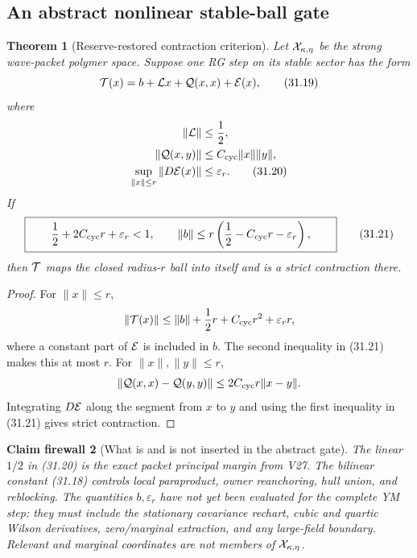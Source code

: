 \documentclass[11pt,oneside]{book}
\newtheorem{theorem}{Theorem}[chapter]
\newtheorem{firewall}[theorem]{Claim firewall}
\theoremstyle{definition}
\theoremstyle{remark}
\begin{document}
\subsection{An abstract nonlinear stable-ball gate}

\begin{theorem}[Reserve-restored contraction criterion]
\label{thm:e8v31-nonlinear-gate}
Let \({\cal X}_{\kappa,\eta}\) be the strong wave-packet polymer
space.  Suppose one RG step on its stable sector has the form
\[
 {\cal T}(x)=b+{\cal L}x+{\cal Q}(x,x)+{\cal E}(x),               \tag{31.19}
\]
where
\[
\begin{split}
 \|{\cal L}\|&\leq\frac12,\\
 \|{\cal Q}(x,y)\|&\leq C_{\rm cyc}\|x\|\|y\|,\\
 \sup_{\|x\|\leq r}\|D{\cal E}(x)\|&\leq\varepsilon_r.            \tag{31.20}
\end{split}
\]
If
\[
 \boxed{\qquad
 \frac12+2C_{\rm cyc}r+\varepsilon_r<1,\qquad
 \|b\|\leq
 r\left(\frac12-C_{\rm cyc}r-\varepsilon_r\right),
\qquad}                                                           \tag{31.21}
\]
then \({\cal T}\) maps the closed radius-\(r\) ball into itself and is
a strict contraction there.
\end{theorem}

\begin{proof}
For \(\|x\|\leq r\),
\[
 \|{\cal T}(x)\|
 \leq\|b\|+\frac12r+C_{\rm cyc}r^2+\varepsilon_rr,
\]
where a constant part of \({\cal E}\) is included in \(b\).  The
second inequality in (31.21) makes this at most \(r\).  For
\(\|x\|,\|y\|\leq r\),
\[
 \|{\cal Q}(x,x)-{\cal Q}(y,y)\|
 \leq2C_{\rm cyc}r\|x-y\|.
\]
Integrating \(D{\cal E}\) along the segment from \(x\) to \(y\) and
using the first inequality in (31.21) gives strict contraction.
\end{proof}

\begin{firewall}[What is and is not inserted in the abstract gate]
\label{fire:e8v31-gate-scope}
The linear \(1/2\) in (31.20) is the exact packet principal margin
from V27.  The bilinear constant (31.18) controls local paraproduct,
owner reanchoring, hull union, and reblocking.  The quantities
\(b,\varepsilon_r\) have not yet been evaluated for the complete YM
step: they must include the stationary covariance rechart, cubic and
quartic Wilson derivatives, zero/marginal extraction, and any
large-field boundary.  Relevant and marginal coordinates are not
members of \({\cal X}_{\kappa,\eta}\).
\end{firewall}
\end{document}
